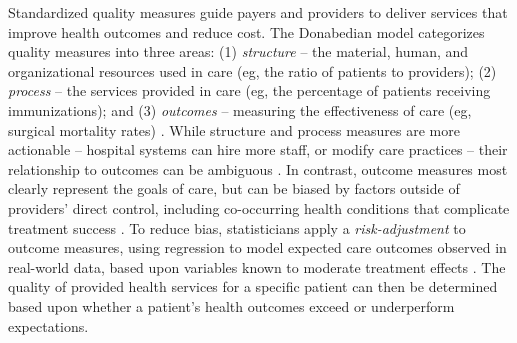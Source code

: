 Standardized quality measures guide payers and providers to deliver services that improve health outcomes and reduce cost.
The Donabedian model categorizes quality measures into three areas: (1) \textit{structure} -- the material, human, and organizational resources used in care (eg, the ratio of patients to providers); (2) \textit{process} -- the services provided in care (eg, the percentage of patients receiving immunizations); and (3) \textit{outcomes} -- measuring the effectiveness of care (eg, surgical mortality rates) \cite{donabedian_quality_1988, endeshaw_healthcare_2020,agency_for_healthcare_research_and_quality_types_2015}.
While structure and process measures are more actionable -- hospital systems can hire more staff, or modify care practices -- their relationship to outcomes can be ambiguous \cite{quentin_measuring_2019}. 
In contrast, outcome measures most clearly represent the goals of care, but can be biased by factors outside of providers' direct control, including co-occurring health conditions that complicate treatment success \cite{lilienfeld_why_2013, quentin_measuring_2019}.
To reduce bias, statisticians apply a \textit{risk-adjustment} to outcome measures, using regression to model expected care outcomes observed in real-world data, based upon variables known to moderate treatment effects \cite{lane-fall_outcomes_2013}.
The quality of provided health services for a specific patient can then be determined based upon whether a patient's health outcomes exceed or underperform expectations.

